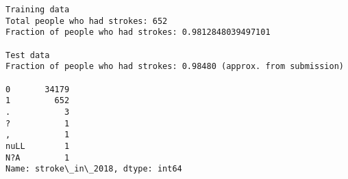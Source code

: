 \documentclass[11pt]{article}
\begin{document}
    \begin{Verbatim}[commandchars=\\\{\}]
Training data
Total people who had strokes: 652
Fraction of people who had strokes: 0.9812848039497101

Test data
Fraction of people who had strokes: 0.98480 (approx. from submission)

0       34179
1         652
.           3
?           1
,           1
nuLL        1
N?A         1
Name: stroke\_in\_2018, dtype: int64

    \end{Verbatim}

    \begin{center}
    \end{center}
    { \hspace*{\fill} \\}
    
\end{document}
